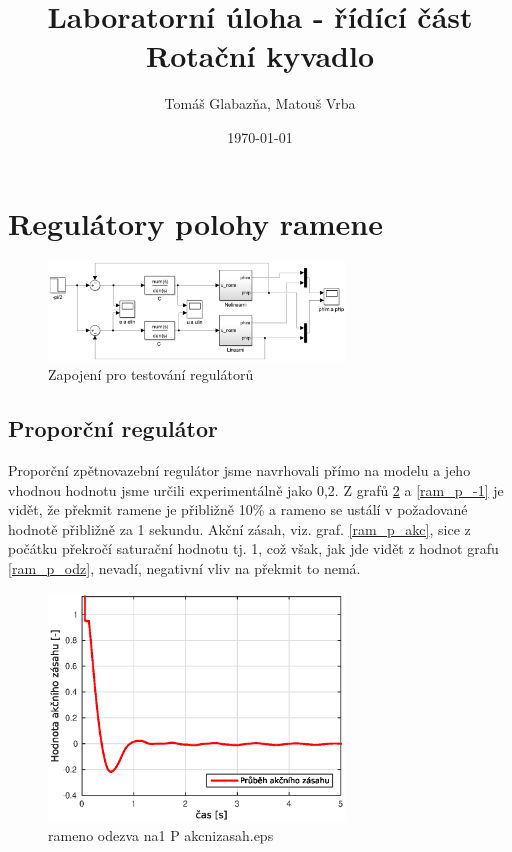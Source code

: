 \documentclass[11pt,a4paper]{article}
\title{%
  Laboratorní úloha - řídící část\\
  \large Rotační kyvadlo}
\author{Tomáš Glabazňa, Matouš Vrba}
\date{\today}
\begin{document}
\maketitle

\clearpage

\section{Regulátory polohy ramene}
\begin{figure}[H]
\centering
\includegraphics[width=0.7\textwidth]{schema_rizeni_nanecisto.jpg}
\caption{Zapojení pro testování regulátorů}
\label{ram_p_1}
\end{figure}

\subsection{Proporční regulátor}

Proporční zpětnovazební regulátor jsme navrhovali přímo na modelu a jeho vhodnou hodnotu jsme určili experimentálně jako 0,2. Z grafů \ref{ram_p_1} a \ref{ram_p_-1} je vidět, že překmit ramene je přibližně 10\% a rameno se ustálí v požadované hodnotě přibližně za 1 sekundu. Akční zásah, viz. graf. \ref{ram_p_akc}, sice z počátku překročí saturační hodnotu tj. 1, což však, jak jde vidět z hodnot grafu \ref{ram_p_odz}, nevadí, negativní vliv na překmit to nemá.

\begin{figure}[H]
\centering
\includegraphics[width=0.7\textwidth]{dobre_grafy/rameno_odezva_na1_P_akcnizasah.eps}
\caption{rameno odezva na1 P akcnizasah.eps}
\label{ram_p_1}
\end{figure}
\end{document}
